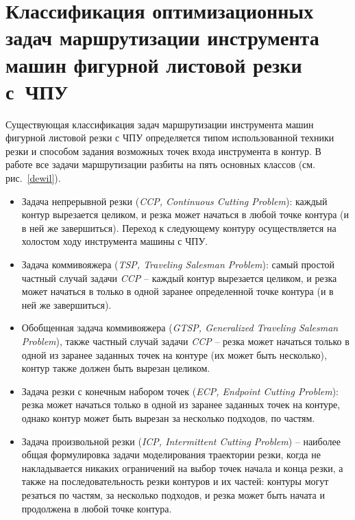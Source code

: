 
\section{
  Классификация оптимизационных задач
  маршрутизации инструмента
  машин фигурной листовой резки с~ЧПУ
}
\label{sect:1.4}
\setcounter{equation}{0}

Существующая  классификация задач маршрутизации инструмента
машин фигурной листовой резки с ЧПУ определяется
типом использованной техники резки и способом задания
возможных точек входа инструмента в контур.
В работе \cite{intro13}
все задачи маршрутизации разбиты на пять основных классов
(см. рис.~\ref{dewil}).

\begin{itemize}
\item Задача непрерывной резки
({\it CCP, Continuous Cutting Problem}):
каждый контур вырезается целиком,
и резка может начаться в любой точке контура (и в ней же завершиться).
Переход к следующему контуру осуществляется на холостом ходу инструмента машины с ЧПУ.

\item Задача коммивояжера
({\it TSP, Traveling Salesman Problem}):
самый простой частный  случай задачи {\it CCP} --
каждый контур вырезается целиком,
и резка может начаться в только в одной заранее определенной точке контура
(и в ней же завершиться).

\item Обобщенная задача коммивояжера
({\it GTSP, Generalized Traveling Salesman Problem}),
также частный случай задачи {\it CCP} --
резка может начаться только в одной из заранее
заданных точек на контуре (их может быть несколько),
контур также должен быть вырезан целиком.

\item Задача резки с конечным набором точек
({\it ECP, Endpoint Cutting Problem}):
резка может начаться только в одной из
заранее заданных точек на контуре,
однако контур может быть вырезан за несколько подходов, по частям.

\item Задача произвольной резки
({\it ICP, Intermittent Cutting Problem})
-- наиболее общая формулировка задачи моделирования траектории резки,
когда не накладывается никаких ограничений на выбор точек начала и конца резки,
а также на последовательность резки контуров и их частей:
контуры могут резаться по частям,
за несколько подходов,
и резка может быть
начата и продолжена в любой точке контура.

\end{itemize}

